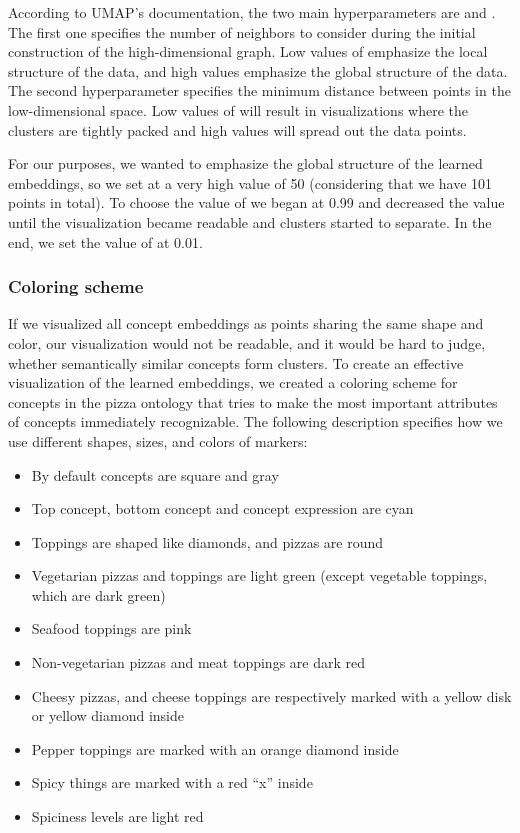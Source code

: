 According to UMAP's documentation, the two main hyperparameters are  and .
The first one specifies the number of neighbors to consider during the initial construction of the high-dimensional graph.
Low values of  emphasize the local structure of the data, and high values emphasize the global structure of the data.
The second hyperparameter specifies the minimum distance between points in the low-dimensional space.
Low values of  will result in visualizations where the clusters are tightly packed and high values will spread out the data points.

For our purposes, we wanted to emphasize the global structure of the learned embeddings, so we set  at a very high value of 50 (considering that we have 101 points in total).
To choose the value of  we began at 0.99 and decreased the value until the visualization became readable and clusters started to separate.
In the end, we set the value of  at 0.01.

\subsubsection{Coloring scheme}

If we visualized all concept embeddings as points sharing the same shape and color, our visualization would not be readable, and it would be hard to judge, whether semantically similar concepts form clusters.
To create an effective visualization of the learned embeddings, we created a coloring scheme for concepts in the pizza ontology that tries to make the most important attributes of concepts immediately recognizable.
The following description specifies how we use different shapes, sizes, and colors of markers:

\begin{itemize}
    \item By default concepts are square and gray
    \item Top concept, bottom concept and concept expression are cyan
    \item Toppings are shaped like diamonds, and pizzas are round
    \item Vegetarian pizzas and toppings are light green (except vegetable toppings, which are dark green)
    \item Seafood toppings are pink
    \item Non-vegetarian pizzas and meat toppings are dark red
    \item Cheesy pizzas, and cheese toppings are respectively marked with a yellow disk or yellow diamond inside
    \item Pepper toppings are marked with an orange diamond inside
    \item Spicy things are marked with a red ``x'' inside
    \item Spiciness levels are light red 
\end{itemize}

